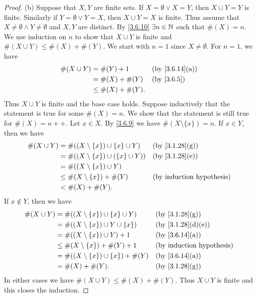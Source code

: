 \begin{proof}{(b)}
  Suppose that \(X, Y\) are finite sets.
  If \(X = \emptyset \lor X = Y\), then \(X \cup Y = Y\) is finite.
  Similarly if \(Y = \emptyset \lor Y = X\), then \(X \cup Y = X\) is finite.
  Thus assume that \(X \neq \emptyset \land Y \neq \emptyset\) and \(X, Y\) are distinct.
  By \cref{3.6.10} \(\exists n \in \mathbb{N}\) such that \(\#(X) = n\).
  We use induction on \(n\) to show that \(X \cup Y\) is finite and \(\#(X \cup Y) \leq \#(X) + \#(Y)\).
  We start with \(n = 1\) since \(X \neq \emptyset\).
  For \(n = 1\), we have
  \begin{align*}
    \#(X \cup Y) & = \#(Y) + 1         &  & \text{(by \cref{3.6.14}(a))} \\
                 & = \#(X) + \#(Y)     &  & \by{3.6.5}                   \\
                 & \leq \#(X) + \#(Y).
  \end{align*}
  Thus \(X \cup Y\) is finite and the base case holds.
  Suppose inductively that the statement is true for some \(\#(X) = n\).
  We show that the statement is still true for \(\#(X) = n++\).
  Let \(x \in X\).
  By \cref{3.6.9} we have \(\#(X \setminus \{x\}) = n\).
  If \(x \in Y\), then we have
  \begin{align*}
    \#(X \cup Y) & = \#((X \setminus \{x\}) \cup \{x\} \cup Y)   &  & \text{(by \cref{3.1.28}(g))} \\
                 & = \#((X \setminus \{x\}) \cup (\{x\} \cup Y)) &  & \text{(by \cref{3.1.28}(e))} \\
                 & = \#((X \setminus \{x\}) \cup Y)                                                \\
                 & \leq \#(X \setminus \{x\}) + \#(Y)            &  & \byIH                        \\
                 & < \#(X) + \#(Y).
  \end{align*}
  If \(x \notin Y\), then we have
  \begin{align*}
    \#(X \cup Y) & = \#((X \setminus \{x\}) \cup \{x\} \cup Y)  &  & \text{(by \cref{3.1.28}(g))}    \\
                 & = \#((X \setminus \{x\}) \cup Y \cup \{x\})  &  & \text{(by \cref{3.1.28}(d)(e))} \\
                 & = \#((X \setminus \{x\}) \cup Y) + 1         &  & \text{(by \cref{3.6.14}(a))}    \\
                 & \leq \#(X \setminus \{x\}) + \#(Y) + 1       &  & \byIH                           \\
                 & = \#((X \setminus \{x\}) \cup \{x\}) + \#(Y) &  & \text{(by \cref{3.6.14}(a))}    \\
                 & = \#(X) + \#(Y).                             &  & \text{(by \cref{3.1.28}(g))}
  \end{align*}
  In either cases we have \(\#(X \cup Y) \leq \#(X) + \#(Y)\).
  Thus \(X \cup Y\) is finite and this closes the induction.


\end{proof}
